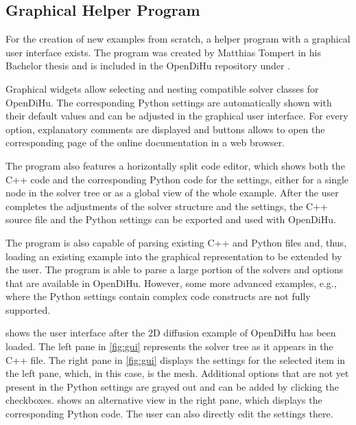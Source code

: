 \subsection{Graphical Helper Program}
For the creation of new examples from scratch, a helper program with a graphical user interface exists. The program was created by Matthias Tompert in his Bachelor thesis and is included in the OpenDiHu repository under .

Graphical widgets allow selecting and nesting compatible solver classes for OpenDiHu. The corresponding Python settings are automatically shown with their default values and can be adjusted in the graphical user interface. For every option, explanatory comments are displayed and buttons allows to open the corresponding page of the online documentation in a web browser.

The program also features a horizontally split code editor, which shows both the C++ code and the corresponding Python code for the settings, either for a single node in the solver tree or as a global view of the whole example. 
After the user completes the adjustments of the solver structure and the settings, the C++ source file and the Python settings can be exported and used with OpenDiHu.

The program is also capable of parsing existing C++ and Python files and, thus, loading an existing example into the graphical representation to be extended by the user. The program is able to parse a large portion of the solvers and options that are available in OpenDiHu. However, some more advanced examples, e.g., where the Python settings contain complex code constructs are not fully supported.

 shows the user interface after the 2D diffusion example of OpenDiHu has been loaded. The left pane in \cref{fig:gui} represents the solver tree as it appears in the C++ file. The right pane in \cref{fig:gui} displays the settings for the selected item in the left pane, which, in this case, is the mesh. Additional options that are not yet present in the Python settings are grayed out and can be added by clicking the checkboxes.
 shows an alternative view in the right pane, which displays the corresponding Python code. The user can also directly edit the settings there.

